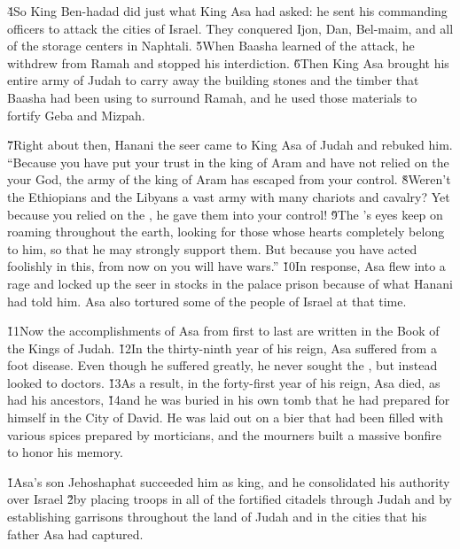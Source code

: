 \v{4}So King Ben-hadad did just what King Asa had asked: he sent his commanding officers to attack the cities of Israel. They conquered Ijon, Dan, Bel-maim, and all of the storage centers in Naphtali. \v{5}When Baasha learned of the attack, he withdrew from Ramah and stopped his interdiction. \v{6}Then King Asa brought his entire army of Judah to carry away the building stones and the timber that Baasha had been using to surround Ramah, and he used those materials to fortify Geba and Mizpah.

\v{7}Right about then, Hanani the seer came to King Asa of Judah and rebuked him. ``Because you have put your trust in the king of Aram and have not relied on the  your God, the army of the king of Aram has escaped from your control. \v{8}Weren't the Ethiopians and the Libyans a vast army with many chariots and cavalry? Yet because you relied on the , he gave them into your control! \v{9}The 's eyes keep on roaming throughout the earth, looking for those whose hearts completely belong to him, so that he may strongly support them. But because you have acted foolishly in this, from now on you will have wars.'' \v{10}In response, Asa flew into a rage and locked up the seer in stocks in the palace prison because of what Hanani had told him. Asa also tortured some of the people of Israel at that time.

\v{11}Now the accomplishments of Asa from first to last are written in the Book of the Kings of Judah. \v{12}In the thirty-ninth year of his reign, Asa suffered from a foot disease. Even though he suffered greatly, he never sought the , but instead looked to doctors. \v{13}As a result, in the forty-first year of his reign, Asa died, as had his ancestors, \v{14}and he was buried in his own tomb that he had prepared for himself in the City of David. He was laid out on a bier that had been filled with various spices prepared by morticians, and the mourners built a massive bonfire to honor his memory.

\v{1}Asa's son Jehoshaphat succeeded him as king, and he consolidated his authority over Israel \v{2}by placing troops in all of the fortified citadels through Judah and by establishing garrisons throughout the land of Judah and in the cities that his father Asa had captured.

